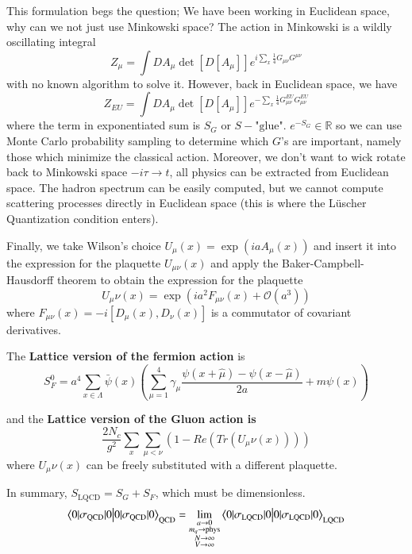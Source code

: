 This formulation begs the question; We have been working in Euclidean space, why can we not just use Minkowski space? The action in Minkowski is a wildly oscillating integral 
\begin{equation}
    Z_\mu = \int DA_\mu \det\left[D[A_\mu]\right] e^{i \sum_{x}^{}\frac{1}{4}G_{\mu\nu}G^{\mu\nu}}
\end{equation}
with no known algorithm to solve it. However, back in Euclidean space, we have 
\begin{equation}
    Z_{EU} = \int DA_\mu \det\left[D[A_\mu]\right] e^{- \sum_{x}^{}\frac{1}{4}G_{\mu\nu}^{EU}G_{\mu\nu}^{EU}}
\end{equation} where the term in exponentiated sum is $S_G$ or $S - \text{"glue"}$. $e^{-S_G} \in \mathbb{R}$ so we can use Monte Carlo probability sampling to determine which $G$'s are important, namely those which minimize the classical action. Moreover, we don't want to wick rotate back to Minkowski space $-i\tau \to t$, all physics can be extracted from Euclidean space. The hadron spectrum can be easily computed, but we cannot compute scattering processes directly in Euclidean space (this is where the L\"{u}scher Quantization condition enters). 

Finally, we take Wilson's choice $U_\mu(x) = \exp\left(iaA_\mu(x)\right)$ and insert it into the expression for the plaquette $U_{\mu\nu}(x)$ and apply the Baker-Campbell-Hausdorff theorem\cite{Hall2004LieGL} to obtain the expression for the plaquette 
\begin{equation}
    U_\mu\nu(x) = \exp\left(ia^2F_{\mu\nu}(x) + \mathcal{O}(a^3) \right)
\end{equation} where $F_{\mu\nu}(x) = -i\left[D_\mu(x),D_\nu(x)\right]$ is a commutator of covariant derivatives. 

The \textbf{Lattice version of the fermion action} is
\begin{equation}
    S_F^0 = a^4 \sum_{x\in\Lambda}^{} \bar{\psi}(x)\left(\sum_{\mu=1}^{4} \gamma_\mu \frac{\psi(x+\hat{\mu}) -\psi(x-\hat{\mu}) }{2a} + m\psi(x)\right)
\end{equation}

and the \textbf{Lattice version of the Gluon action is} 
\begin{equation}
    \frac{2N_c}{g^2} \sum_{x}^{} \sum_{\mu<\nu}^{} \left(1 - Re(Tr(U_\mu\nu(x)))\right)
\end{equation}
where $U_\mu\nu(x)$ can be freely substituted with a different plaquette. 

In summary, $S_{\text{LQCD}} = S_G + S_F$, which must be dimensionless. 
\begin{equation}
    \braket{0|\sigma_{\text{QCD}}|0}_{\text{QCD}} = \lim_{\substack{a\to 0 \\ m_q \to \text{phys} \\ N\to\infty \\ V \to \infty}} \braket{0|\sigma_{\text{LQCD}}|0}_{\text{LQCD}}
\end{equation}

